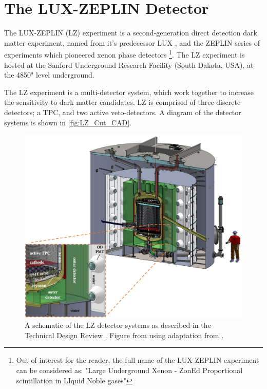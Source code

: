 \section{The LUX-ZEPLIN Detector}
\label{sec:lz_detector}
\par
The LUX-ZEPLIN (LZ) experiment is a second-generation direct detection dark matter experiment, named from it's predecessor LUX \cite{lux_ref}, and the ZEPLIN series of experiments which pioneered xenon phase detectors \cite{zeplin_3_ref}\footnote{Out of interest for the reader, the full name of the LUX-ZEPLIN experiment can be considered as: "Large Underground Xenon - ZonEd Proportional scintillation in LIquid Noble gases"}.
The LZ experiment is hosted at the Sanford Underground Research Facility (South Dakota, USA), at the 4850" level underground.


\par
The LZ experiment is a multi-detector system, which work together to increase the sensitivity to dark matter candidates.
LZ is comprised of three discrete detectors; a TPC, and two active veto-detectors.
A diagram of the detector systems is shown in \autoref{fig:LZ_Cut_CAD}.

\begin{figure}
    \centering
    \includegraphics[width=\textwidth]{Figures/LZ/LZ_CAD_with_interactions.png}
    \caption{A schematic of the LZ detector systems as described in the Technical Design Review \cite{LZ_TechnicalDesignReview_ref}.
             Figure from \cite{LZ_TechnicalDesignReview_ref} using adaptation from \cite{LZ_Ibles_LZStats_Thesis_ref}.}
    \label{fig:LZ_Cut_CAD}
\end{figure}

